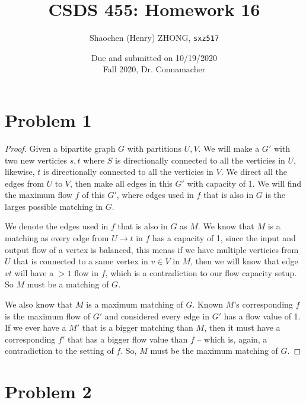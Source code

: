 \documentclass[11pt]{article}
\newcommand{\ilc}{\texttt}
\begin{document}
\title{\textbf{CSDS 455: Homework 16}}

\author{Shaochen (Henry) ZHONG, \ilc{sxz517}}
\date{Due and submitted on 10/19/2020 \\ Fall 2020, Dr. Connamacher}
\maketitle



\section*{Problem 1}

\begin{proof}

Given a bipartite graph $G$ with partitions $U, V$. We will make a $G'$ with two new verticies $s, t$ where $S$ is directionally connected to all the verticies in $U$, likewise, $t$ is directionally connected to all the verticies in $V$. We direct all the edges from $U$ to $V$, then make all edges in this $G'$ with capacity of 1. We will find the maximum flow $f$ of this $G'$, where edges used in $f$ that is also in $G$ is the larges possible matching in $G$.\newline

We denote the edges used in $f$ that is also in $G$ as $M$. We know that $M$ is a matching as every edge from $U \to t$ in $f$ has a capacity of 1, since the input and output flow of a vertex is balanced, this menas if we have multiple verticies from $U$ that is connected to a same vertex in $v \in V$ in $M$, then we will know that edge $vt$ will have a $> 1$ flow in $f$, which is a contradiction to our flow capacity setup. So $M$ must be a matching of $G$.

We also know that $M$ is a maximum matching of $G$. Known $M$'s corresponding $f$ is the maximum flow of $G'$ and considered every edge in $G'$ has a flow value of 1. If we ever have a $M'$ that is a bigger matching than $M$, then it must have a corresponding $f'$ that has a bigger flow value than $f$ -- which is, again, a contradiction to the setting of $f$. So, $M$ must be the maximum matching of $G$.

\end{proof}


\section*{Problem 2}
\end{document}
